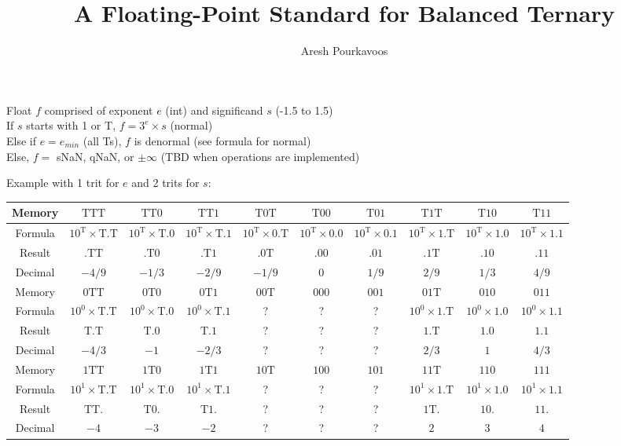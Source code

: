 \documentclass{article}
\begin{document}
\title{A Floating-Point Standard for Balanced Ternary}
\author{Aresh Pourkavoos}
\noindent
Float $f$ comprised of exponent $e$ (int) and significand $s$ (-1.5 to 1.5) \\
If $s$ starts with 1 or T, $f = 3^e \times s$ (normal) \\
Else if $e=e_{min}$ (all Ts), $f$ is denormal (see formula for normal) \\
Else, $f =$ sNaN, qNaN, or $\pm\infty$ (TBD when operations are implemented)
\setlength{\tabcolsep}{5pt}
\renewcommand{\arraystretch}{1.25}

\noindent
Example with 1 trit for $e$ and 2 trits for $s$: \\
\newcommand{\T}{\text{T}}
\hspace{-2cm}
\begin{tabular}{*{10}{|c}|}
  \hline
  Memory
  & $\T\T\T$ & $\T\T0$ & $\T\T1$
  & $\T0\T$ & $\T00$ & $\T01$
  & $\T1\T$ & $\T10$ & $\T11$ \\ \hline
  Formula
  & $10^\T \times \T.\T$ & $10^\T \times \T.0$ & $10^\T \times \T.1$
  & $10^\T \times 0.\T$ & $10^\T \times 0.0$ & $10^\T \times 0.1$
  & $10^\T \times 1.\T$ & $10^\T \times 1.0$ & $10^\T \times 1.1$ \\ \hline
  Result
  & $.\T\T$ & $.\T0$ & $.\T1$
  & $.0\T$ & $.00$ & $.01$
  & $.1\T$ & $.10$ & $.11$ \\ \hline
  Decimal
  & $-4/9$ & $-1/3$ & $-2/9$
  & $-1/9$ & $0$ & $1/9$
  & $2/9$ & $1/3$ & $4/9$ \\ \hline
  \hline
  Memory
  & $0\T\T$ & $0\T0$ & $0\T1$
  & $00\T$ & $000$ & $001$
  & $01\T$ & $010$ & $011$ \\ \hline
  Formula
  & $10^0 \times \T.\T$ & $10^0 \times \T.0$ & $10^0 \times \T.1$
  & ? & ? & ?
  & $10^0 \times 1.\T$ & $10^0 \times 1.0$ & $10^0 \times 1.1$ \\ \hline
  Result
  & $\T.\T$ & $\T.0$ & $\T.1$
  & ? & ? & ?
  & $1.\T$ & $1.0$ & $1.1$ \\ \hline
  Decimal
  & $-4/3$ & $-1$ & $-2/3$
  & ? & ? & ?
  & $2/3$ & $1$ & $4/3$ \\ \hline
  \hline
  Memory
  & $1\T\T$ & $1\T0$ & $1\T1$
  & $10\T$ & $100$ & $101$
  & $11\T$ & $110$ & $111$ \\ \hline
  Formula
  & $10^1 \times \T.\T$ & $10^1 \times \T.0$ & $10^1 \times \T.1$
  & ? & ? & ?
  & $10^1 \times 1.\T$ & $10^1 \times 1.0$ & $10^1 \times 1.1$ \\ \hline
  Result
  & $\T\T.$ & $\T0.$ & $\T1.$
  & ? & ? & ?
  & $1\T.$ & $10.$ & $11.$ \\ \hline
  Decimal
  & $-4$ & $-3$ & $-2$
  & ? & ? & ?
  & $2$ & $3$ & $4$ \\ \hline
\end{tabular}
\end{document}
